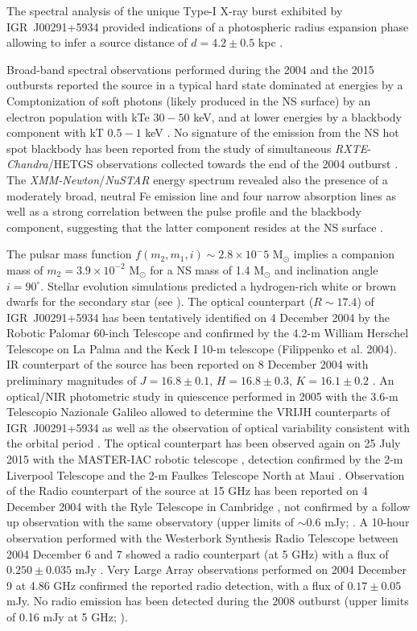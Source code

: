 \documentclass[graybox]{svmult}
\def \chandra {{\em Chandra\xspace}}
\def \xmm {{\em XMM-Newton\xspace}}
\def \rxte {{\em RXTE\xspace}}
\def \nustar{{\em NuSTAR\xspace}}
\begin{document}
The spectral analysis of the unique Type-I X-ray burst exhibited by IGR~J00291+5934 provided indications of a photospheric radius expansion phase allowing to infer a source distance of $d = 4.2\pm0.5$ kpc \cite{Bozzo2015,DeFalco2017}.


Broad-band spectral observations performed during the 2004 and the 2015 outbursts reported the source in a typical hard state dominated at energies by a Comptonization of soft photons (likely produced in the NS surface) by an electron population with kTe $30-50$ keV, and at lower energies by a blackbody component with kT $0.5-1$ keV \cite{Falanga2005b,Sanna2017d}. No signature of the emission from the NS hot spot blackbody has been reported from the study of simultaneous \rxte{}-\chandra{}/HETGS observations collected towards the end of the 2004 outburst \cite{Paizis2005}. The \xmm{}/\nustar{} energy spectrum revealed also the presence of a moderately broad, neutral Fe emission line and four narrow absorption lines as well as a strong correlation between the pulse profile and the blackbody component, suggesting that the latter component resides at the NS surface \cite{Sanna2017d}.

The pulsar mass function $f(m_2,m_1,i)\sim 2.8\times 10^-5$ M$_\odot$ implies a companion mass of $m_2=3.9\times 10^{-2}$ M$_\odot$ for a NS mass of 1.4 M$_\odot$ and inclination angle $i=90^\circ$. Stellar evolution simulations predicted a hydrogen-rich white or brown dwarfs for the secondary star (see \cite{Bildsten2001}). The optical counterpart ($R\sim17.4$) of IGR~J00291+5934 has been tentatively identified on 4 December 2004 by the Robotic Palomar 60-inch Telescope \cite{Fox2004} and confirmed by the 4.2-m William Herschel Telescope on La Palma \cite{Roelofs2004} and the Keck I 10-m telescope (Filippenko et al. 2004). IR counterpart of the source has been reported on 8 December 2004 with preliminary magnitudes of $J=16.8\pm0.1$, $H=16.8\pm0.3$, $K=16.1\pm 0.2$ \cite{Steeghs2004}. An optical/NIR photometric study in quiescence performed in 2005 with the 3.6-m Telescopio Nazionale Galileo allowed to determine the VRIJH counterparts of IGR~J00291+5934 as well as the observation of optical variability consistent with the orbital period \cite{DAvanzo2007}. The optical counterpart has been observed again on 25 July 2015 with the MASTER-IAC robotic telescope \cite{Rebolo2015b}, detection confirmed by the 2-m Liverpool Telescope \cite{Kopac2015} and the 2-m Faulkes Telescope North at Maui \cite{Russell2015}. Observation of the Radio counterpart of the source at 15 GHz has been reported on 4 December 2004 with the Ryle Telescope in Cambridge \cite{Pooley2004}, not confirmed by a follow up observation with the same observatory (upper limits of $\sim0.6$ mJy; \cite{Fender2004}. A 10-hour observation performed with the Westerbork Synthesis Radio Telescope between 2004 December 6 and 7 showed a radio counterpart (at 5 GHz) with a flux of $0.250\pm0.035$ mJy \cite{Fender2004}. Very Large Array observations performed on 2004 December 9 at 4.86 GHz confirmed the reported radio detection, with a flux of $0.17\pm0.05$ mJy. No radio emission has been detected during the 2008 outburst (upper limits of 0.16 mJy at 5 GHz; \cite{Linares2008}). 
\end{document}
